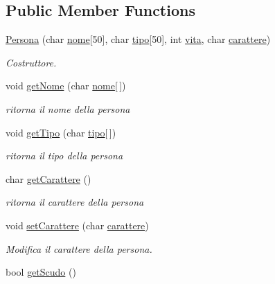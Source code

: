 \subsection*{Public Member Functions}
\begin{DoxyCompactItemize}
\item 
\hyperlink{classPersona_a5e4c7859de8f9284666715dbc5614ccd}{Persona} (char \hyperlink{classPersona_a15d4ded972e8bdd3f02e89c6ccb71b73}{nome}\mbox{[}50\mbox{]}, char \hyperlink{classPersona_ae7069f0467a3b2f1d269c1a143b730eb}{tipo}\mbox{[}50\mbox{]}, int \hyperlink{classPersona_a1e784d3a56cddd6ba8e81387df1efc7b}{vita}, char \hyperlink{classPersona_a1fff44e46be477b79413387307b0aaff}{carattere})
\begin{DoxyCompactList}\small\item\em Costruttore. \end{DoxyCompactList}\item 
void \hyperlink{classPersona_a4bea4b34933c85e2eee8443cdba6a940}{get\+Nome} (char \hyperlink{classPersona_a15d4ded972e8bdd3f02e89c6ccb71b73}{nome}\mbox{[}$\,$\mbox{]})
\begin{DoxyCompactList}\small\item\em ritorna il nome della persona \end{DoxyCompactList}\item 
void \hyperlink{classPersona_a8edc79607b544d69427da678bffbef51}{get\+Tipo} (char \hyperlink{classPersona_ae7069f0467a3b2f1d269c1a143b730eb}{tipo}\mbox{[}$\,$\mbox{]})
\begin{DoxyCompactList}\small\item\em ritorna il tipo della persona \end{DoxyCompactList}\item 
\hypertarget{classPersona_a008f0bc840f0e3e1dd306832f798637b}{}char \hyperlink{classPersona_a008f0bc840f0e3e1dd306832f798637b}{get\+Carattere} ()\label{classPersona_a008f0bc840f0e3e1dd306832f798637b}

\begin{DoxyCompactList}\small\item\em ritorna il carattere della persona \end{DoxyCompactList}\item 
void \hyperlink{classPersona_a9fcee7f1342f27a4c34d8e8275f4ba24}{set\+Carattere} (char \hyperlink{classPersona_a1fff44e46be477b79413387307b0aaff}{carattere})
\begin{DoxyCompactList}\small\item\em Modifica il carattere della persona. \end{DoxyCompactList}\item 
\hypertarget{classPersona_aa28e4ec15979f7a01f71e1c1888e5116}{}bool \hyperlink{classPersona_aa28e4ec15979f7a01f71e1c1888e5116}{get\+Scudo} ()\label{classPersona_aa28e4ec15979f7a01f71e1c1888e5116}


\end{DoxyCompactItemize}
